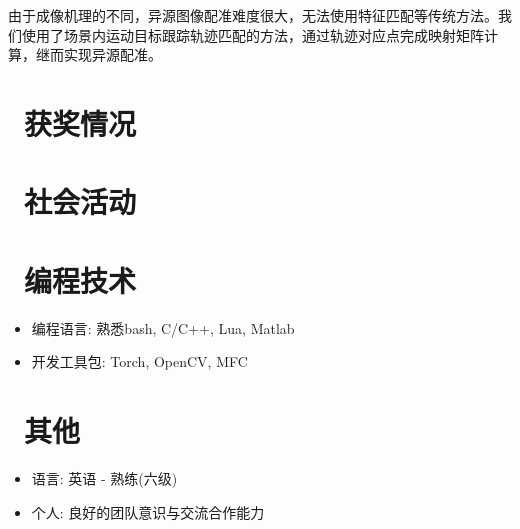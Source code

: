 \documentclass{resume}
\begin{document}
由于成像机理的不同，异源图像配准难度很大，无法使用特征匹配等传统方法。我们使用了场景内运动目标跟踪轨迹匹配的方法，通过轨迹对应点完成映射矩阵计算，继而实现异源配准。

\section{\faTrophy\ 获奖情况}


\section{\faSlideshare\ 社会活动}



\begin{multicols}{2}
\section{\faTerminal\ 编程技术}
\begin{itemize}[parsep=0.5ex]
  \item 编程语言: 熟悉bash, C/C++, Lua, Matlab
  \item 开发工具包: Torch, OpenCV, MFC
\end{itemize}

\section{\faInfo\ 其他}
\begin{itemize}[parsep=0.5ex]
  \item 语言: 英语 - 熟练(六级)
  \item 个人: 良好的团队意识与交流合作能力
\end{itemize}

\end{multicols}
\end{document}
